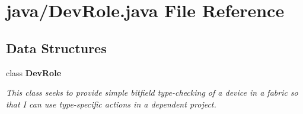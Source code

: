 \section{java/\+Dev\+Role.java File Reference}
\label{DevRole_8java}
\subsection*{Data Structures}
\begin{DoxyCompactItemize}
\item 
class {\bf Dev\+Role}
\begin{DoxyCompactList}\small\item\em This class seeks to provide simple bitfield type-\/checking of a device in a fabric so that I can use type-\/specific actions in a dependent project. \end{DoxyCompactList}\end{DoxyCompactItemize}
